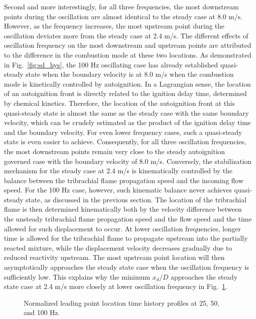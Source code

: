 Second and more interestingly, for all three frequencies, the most downstream points during the oscillation are almost identical to the steady case at 8.0 m/s.  However, as the frequency increases, the most upstream point during the oscillation deviates more from the steady case at 2.4 m/s.  The different effects of oscillation frequency on the most downstream and upstream points are attributed to the difference in the combustion mode at these two locations.  As demonstrated in Fig.~\ref{fig:sd_hys}, the 100 Hz oscillating case has already established quasi-steady state when the boundary velocity is at 8.0 m/s when the combustion mode is kinetically controlled by autoignition.  In a Lagrangian sense, the location of an autoignition front is directly related to the ignition delay time, determined by chemical kinetics.  Therefore, the location of the autoignition front at this quasi-steady state is almost the same as the steady case with the same boundary velocity, which can be crudely estimated as the product of the ignition delay time and the boundary velocity.  For even lower frequency cases, such a quasi-steady state is even easier to achieve.  Consequently, for all three oscillation frequencies, the most downstream points remain very close to the steady autoignition governed case with the boundary velocity of 8.0 m/s.  Conversely, the stabilization mechanism for the steady case at 2.4 m/s is kinematically controlled by the balance between the tribrachial flame propagation speed and the incoming flow speed.  For the 100 Hz case, however, such kinematic balance never achieves quasi-steady state, as discussed in the previous section.  The location of the tribrachial flame is then determined kinematically both by the velocity difference between the unsteady tribrachial flame propagation speed and the flow speed and the time allowed for such displacement to occur.  At lower oscillation frequencies, longer time is allowed for the tribrachial flame to propagate upstream into the partially reacted mixture, while the displacement velocity decreases gradually due to reduced reactivity upstream.  The most upstream point location will then asymptotically approaches the steady state case when the oscillation frequency is sufficiently low.  This explains why the minimum $x_d/D$ approaches the steady state case at 2.4 m/s more closely at lower oscillation frequency in Fig.~\ref{fig:xd_evo}.

\begin{figure}[t]
  \centering
  \scriptsize
  \resizebox{1.0\textwidth}{!}{}
  \normalsize
  \caption{Normalized leading point location time history profiles at 25, 50, and 100 Hz.}
  \label{fig:xd_evo}
\end{figure}    

